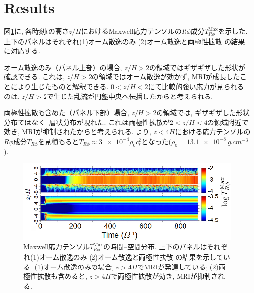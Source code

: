 \documentclass[a4paper,10pt,oneside,twocolumn,notitlepage,final,dvipdfmx]{jarticle}
\begin{document}
\section{Results}
図\ref{fig:colourbar}に, 各時刻$t$の高さ$z/H$におけるMaxwell応力テンソルの$R\phi$成分$T^{\mathrm{Max}}_{R\phi}$を示した. 上下のパネルはそれぞれ(1)オーム散逸のみ (2)オーム散逸と両極性拡散 の結果に対応する. %
\par
オーム散逸のみ（パネル上部）の場合, \( z/H > 2 \)の領域ではギザギザした形状が確認できる. これは, \( z/H > 2 \)の領域ではオーム散逸が効かず, MRIが成長したことにより生じたものと解釈できる. \( 0 < z/H < 2 \)にて比較的強い応力が見られるのは, \( z/H > 2 \)で生じた乱流が円盤中央へ伝播したからと考えられる. 
\par
両極性拡散も含めた（パネル下部）場合,  \( z/H > 2 \)の領域では, ギザギザした形状分布ではなく, 層状分布が現れた. これは両極性拡散が\( 2 < z/H < 4 \)の領域附近で効き, MRIが抑制されたからと考えられる. より, \( z<4H \)における応力テンソルの$R\phi$成分$T_{R\phi}$を見積もると\( T_{R\phi} \approx \num{3e-4}\rho_0 c_s^2 \)となった(\( \rho_0 = \SI{13.1e-8}{g.cm^{-3}} \)). 
\begin{figure}\label{fig:colourbar}
  \centering
  \includegraphics[width=1\linewidth]{./contents/colorbarMRI.png}
  \caption{Maxwell応力テンソル$T^{\mathrm{Max}}_{R\phi}$の時間--空間分布. 上下のパネルはそれぞれ(1)オーム散逸のみ (2)オーム散逸と両極性拡散 の結果を示している. (1)オーム散逸のみの場合, \( z>4H \)でMRIが発達している; (2)両極性拡散も含めると, \( z>4H \)で両極性拡散が効き, MRIが抑制される.}
\end{figure}
\end{document}
